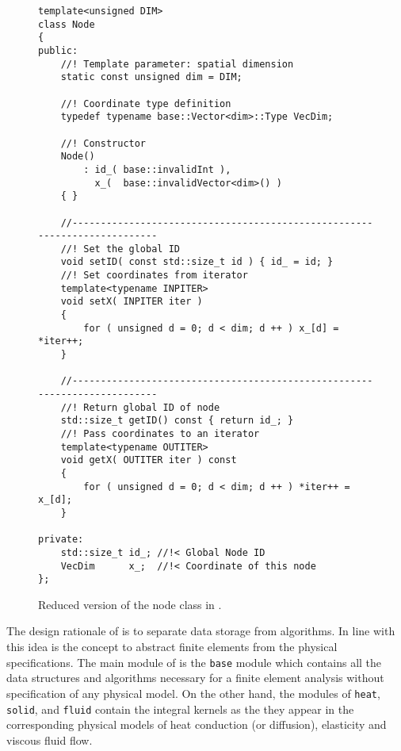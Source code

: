 \begin{figure}[htbp]
  \centering
 \begin{lstlisting}
template<unsigned DIM>
class Node
{
public:
    //! Template parameter: spatial dimension
    static const unsigned dim = DIM;

    //! Coordinate type definition
    typedef typename base::Vector<dim>::Type VecDim;

    //! Constructor
    Node()
        : id_( base::invalidInt ),
          x_(  base::invalidVector<dim>() )
    { }

    //--------------------------------------------------------------------------
    //! Set the global ID
    void setID( const std::size_t id ) { id_ = id; }
    //! Set coordinates from iterator
    template<typename INPITER>
    void setX( INPITER iter )
    {
        for ( unsigned d = 0; d < dim; d ++ ) x_[d] = *iter++;
    }

    //--------------------------------------------------------------------------
    //! Return global ID of node
    std::size_t getID() const { return id_; }
    //! Pass coordinates to an iterator
    template<typename OUTITER>
    void getX( OUTITER iter ) const
    {
        for ( unsigned d = 0; d < dim; d ++ ) *iter++ = x_[d];
    }
    
private:
    std::size_t id_; //!< Global Node ID
    VecDim      x_;  //!< Coordinate of this node
};
 \end{lstlisting}
  \caption{Reduced version of the node class in \IS.}
  \label{fig:node}
\end{figure}


The design rationale of \IS{} is to separate data storage from
algorithms. In line with this idea is the concept to abstract finite
elements from the physical specifications. The main module of \IS{} is
the \texttt{base} module which contains all the data structures and
algorithms necessary for a finite element analysis without
specification of any physical model. On the other hand, the modules of
\texttt{heat}, \texttt{solid}, and \texttt{fluid} contain the integral
kernels as the they appear in the corresponding physical models of
heat conduction (or diffusion), elasticity and viscous fluid flow.

